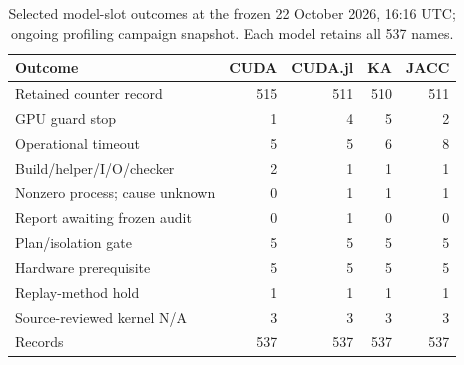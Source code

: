 \begin{table}[t]
\centering\small
\caption{Selected model-slot outcomes at the frozen 22 October 2026, 16:16 UTC; ongoing profiling campaign snapshot. Each model retains all 537 names.}
\label{tab:roofline-failures-selected}
\begin{tabular}{lrrrr}
\toprule
Outcome & CUDA & CUDA.jl & KA & JACC \\
\midrule
Retained counter record & 515 & 511 & 510 & 511 \\
GPU guard stop & 1 & 4 & 5 & 2 \\
Operational timeout & 5 & 5 & 6 & 8 \\
Build/helper/I/O/checker & 2 & 1 & 1 & 1 \\
Nonzero process; cause unknown & 0 & 1 & 1 & 1 \\
Report awaiting frozen audit & 0 & 1 & 0 & 0 \\
Plan/isolation gate & 5 & 5 & 5 & 5 \\
Hardware prerequisite & 5 & 5 & 5 & 5 \\
Replay-method hold & 1 & 1 & 1 & 1 \\
Source-reviewed kernel N/A & 3 & 3 & 3 & 3 \\
\midrule
Records & 537 & 537 & 537 & 537 \\
\bottomrule
\end{tabular}
\end{table}
